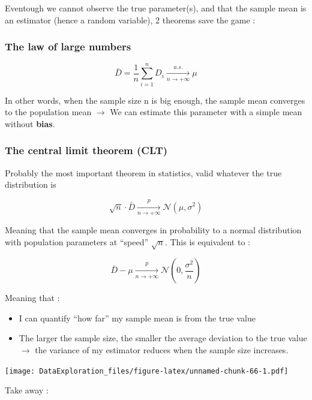 \documentclass[
]{book}
\providecommand{\tightlist}{%
  \setlength{\itemsep}{0pt}\setlength{\parskip}{0pt}}
\begin{document}
Eventough we cannot observe the true parameter(s), and that the sample mean is an estimator (hence a random variable), 2 theorems save the game :

\hypertarget{the-law-of-large-numbers}{%
\subsubsection{The law of large numbers}\label{the-law-of-large-numbers}}

\[\bar{D} = \dfrac{1}{n} \sum_{i=1}^n D_i \xrightarrow[n \to +\infty]{a.s.} \mu\]

In other words, when the sample size n is big enough, the sample mean converges to the population mean \(\rightarrow\) We can estimate this parameter with a simple mean without \textbf{bias}.

\hypertarget{the-central-limit-theorem-clt}{%
\subsubsection{The central limit theorem (CLT)}\label{the-central-limit-theorem-clt}}

Probably the most important theorem in statistics, valid whatever the true distribution is

\[\sqrt{n} \cdot \bar{D} \xrightarrow[n \to +\infty]{p}  \mathcal{N} (\mu,\sigma^2)\]

Meaning that the sample mean converges in probability to a normal distribution with population parameters at ``speed'' \(\sqrt{n}\). This is equivalent to :

\[ \bar{D} - \mu \xrightarrow[n \to +\infty]{p}  \mathcal{N} (0,\frac{\sigma^2}{n})\]

Meaning that :

\begin{itemize}
\tightlist
\item
  I can quantify ``how far'' my sample mean is from the true value
\item
  The larger the sample size, the smaller the average deviation to the true value \(\rightarrow\) the variance of my estimator reduces when the sample size increases.
\end{itemize}

\texttt{[image: DataExploration\_files/figure-latex/unnamed-chunk-66-1.pdf]}

Take away :
\end{document}
